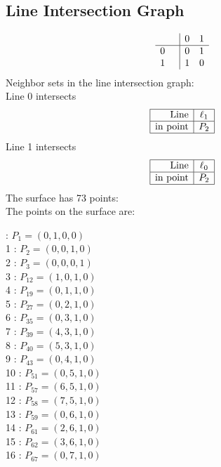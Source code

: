 \documentclass{article}
\begin{document}
{\subsection*{Line Intersection Graph}
{\arraycolsep=1pt
$$
\begin{array}{rr|*{2}r}
 &  & 0 & 1\\
\hline
0 &  & 0 & 1\\
1 &  & 1 & 0\\
\end{array}
$$
}%
Neighbor sets in the line intersection graph:\\
Line 0 intersects 
$$
\begin{array}{|r*{1}{|c}|}
\hline
\mbox{Line}  & \ell_{1}\\
\hline
\mbox{in point}  & P_{2}\\
\hline
\end{array}
$$
Line 1 intersects 
$$
\begin{array}{|r*{1}{|c}|}
\hline
\mbox{Line}  & \ell_{0}\\
\hline
\mbox{in point}  & P_{2}\\
\hline
\end{array}
$$
The surface has 73 points:\\
The points on the surface are:\\
\begin{multicols}{3}
 : $P_{1}=( 0, 1, 0, 0 )$\\
1 : $P_{2}=( 0, 0, 1, 0 )$\\
2 : $P_{3}=( 0, 0, 0, 1 )$\\
3 : $P_{12}=( 1, 0, 1, 0 )$\\
4 : $P_{19}=( 0, 1, 1, 0 )$\\
5 : $P_{27}=( 0, 2, 1, 0 )$\\
6 : $P_{35}=( 0, 3, 1, 0 )$\\
7 : $P_{39}=( 4, 3, 1, 0 )$\\
8 : $P_{40}=( 5, 3, 1, 0 )$\\
9 : $P_{43}=( 0, 4, 1, 0 )$\\
10 : $P_{51}=( 0, 5, 1, 0 )$\\
11 : $P_{57}=( 6, 5, 1, 0 )$\\
12 : $P_{58}=( 7, 5, 1, 0 )$\\
13 : $P_{59}=( 0, 6, 1, 0 )$\\
14 : $P_{61}=( 2, 6, 1, 0 )$\\
15 : $P_{62}=( 3, 6, 1, 0 )$\\
16 : $P_{67}=( 0, 7, 1, 0 )$\\

\end{multicols}}
\end{document}
